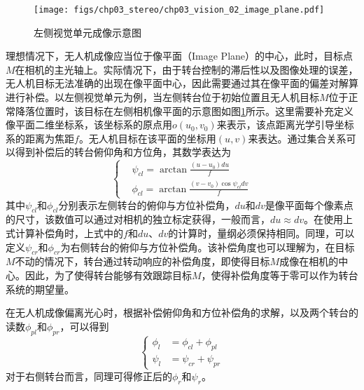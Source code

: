 \begin{figure}[!tb]
	\centering
	\texttt{[image: figs/chp03\_stereo/chp03\_vision\_02\_image\_plane.pdf]}	
	\caption{左侧视觉单元成像示意图}
	\label{fig:chp03_vision_02_image_plane}
\end{figure}

理想情况下，无人机成像应当位于像平面（Image Plane）的中心，此时，目标点$M$在相机的主光轴上。实际情况下，由于转台控制的滞后性以及图像处理的误差，无人机目标无法准确的出现在像平面中心，因此需要通过其在像平面的偏差对解算进行补偿。以左侧视觉单元为例，当左侧转台位于初始位置且无人机目标$M$位于正常降落位置时，该目标在左侧相机像平面的示意图如图\ref{fig:chp03_vision_02_image_plane}所示。这里需要补充定义像平面二维坐标系，该坐标系的原点用$o(u_0, v_0)$来表示，该点距离光学引导坐标系的距离为焦距$f$。无人机目标在该平面的坐标用$(u,v)$来表达。通过集合关系可以得到补偿后的转台俯仰角和方位角，其数学表达为
\begin{equation} 
\left \{
\begin{split}
& \psi_{cl} = \arctan \frac{(u-u_0)du}{f} \\
& \phi_{cl} = \arctan \frac{(v-v_0)\cos\psi_{cl}dv}{f} 
\end{split}
\right.
\end{equation}
其中$\psi_{cl}$和$\phi_{cl}$分别表示左侧转台的俯仰与方位补偿角，$du$和$dv$是像平面每个像素点的尺寸，该数值可以通过对相机的独立标定获得，一般而言，$du \approx dv$。在使用上式计算补偿角时，上式中的$f$和$du$、$dv$的计算时，量纲必须保持相同。同理，可以定义$\psi_{cr}$和$\phi_{cr}$为右侧转台的俯仰与方位补偿角。该补偿角度也可以理解为，在目标$M$不动的情况下，转台通过转动响应的补偿角度，即使得目标$M$成像在相机的中心。因此，为了使得转台能够有效跟踪目标$M$，使得补偿角度等于零可以作为转台系统的期望量。

在无人机成像偏离光心时，根据补偿俯仰角和方位补偿角的求解，以及两个转台的读数$\phi_{pl}$和$\phi_{pr}$，可以得到
\begin{equation} 
\left \{
\begin{split}
\phi_l &= \phi_{cl} + \phi_{pl} \\ 
\psi_l &= \psi_{cr} + \psi_{pr}
\end{split}
\right.
\end{equation}
对于右侧转台而言，同理可得修正后的$\phi_r$和$\psi_r$。 

